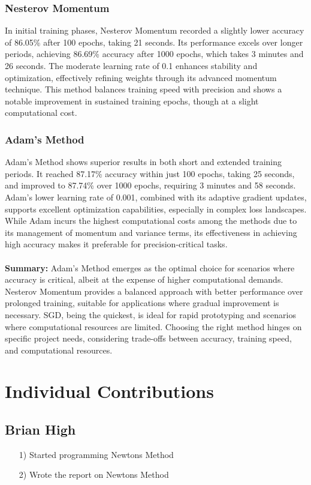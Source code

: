 \documentclass{article}
\begin{document}
\subsubsection{Nesterov Momentum}
In initial training phases, Nesterov Momentum recorded a slightly lower accuracy of 86.05\% after 100 epochs, taking 21 seconds. Its performance excels over longer periods, achieving 86.69\% accuracy after 1000 epochs, which takes 3 minutes and 26 seconds. The moderate learning rate of 0.1 enhances stability and optimization, effectively refining weights through its advanced momentum technique. This method balances training speed with precision and shows a notable improvement in sustained training epochs, though at a slight computational cost.

\subsubsection{Adam's Method}
Adam's Method shows superior results in both short and extended training periods. It reached 87.17\% accuracy within just 100 epochs, taking 25 seconds, and improved to 87.74\% over 1000 epochs, requiring 3 minutes and 58 seconds. Adam's lower learning rate of 0.001, combined with its adaptive gradient updates, supports excellent optimization capabilities, especially in complex loss landscapes. While Adam incurs the highest computational costs among the methods due to its management of momentum and variance terms, its effectiveness in achieving high accuracy makes it preferable for precision-critical tasks. \\ \\
\textbf{Summary:} Adam's Method emerges as the optimal choice for scenarios where accuracy is critical, albeit at the expense of higher computational demands. Nesterov Momentum provides a balanced approach with better performance over prolonged training, suitable for applications where gradual improvement is necessary. SGD, being the quickest, is ideal for rapid prototyping and scenarios where computational resources are limited. Choosing the right method hinges on specific project needs, considering trade-offs between accuracy, training speed, and computational resources.

\section{Individual Contributions}

\subsection*{Brian High}
\begin{itemize}
    \item[1)] Started programming Newtons Method
    \item[2)] Wrote the report on Newtons Method
\end{itemize}
\end{document}
